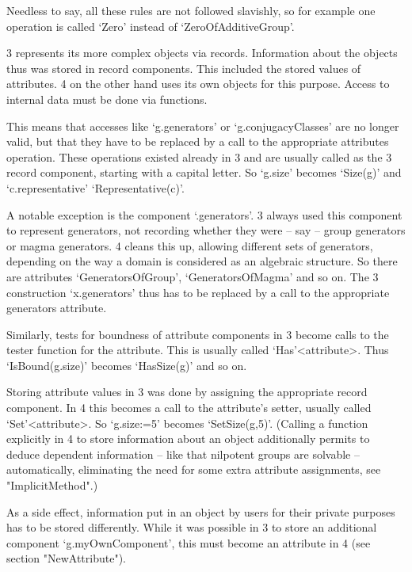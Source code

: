 Needless to say, all these rules are not followed slavishly, so for example
one operation is called `Zero' instead of `ZeroOfAdditiveGroup'.


{\GAP}3 represents its more complex objects via records. Information about the
objects thus was stored in record components. This included the stored
values of attributes. {\GAP}4 on the other hand uses its own objects for
this purpose. Access to internal data must be done via functions.

This means that accesses like `g.generators' or `g.conjugacyClasses' are no
longer valid, but that they have to be replaced by a call to the
appropriate attributes operation. These operations existed already in
{\GAP}3 and are usually called as the {\GAP}3 record component,
starting with a capital letter. 
So `g.size' becomes `Size(g)' and `c.representative' `Representative(c)'.

A notable exception is the component `.generators'. {\GAP}3 always used this
component to represent generators, not recording whether they were -- say --
group generators or magma generators. {\GAP}4 cleans this up, allowing
different sets of generators, depending on the way a domain is considered as
an algebraic structure. So there are attributes `GeneratorsOfGroup',
`GeneratorsOfMagma' and so on. The {\GAP}3 construction `x.generators' thus
has to be replaced by a call to the appropriate generators attribute.

Similarly, tests for boundness of attribute components in {\GAP}3 become
calls to the tester function for the attribute. This is usually called
`Has'<attribute>. Thus `IsBound(g.size)' becomes `HasSize(g)' and so on.

Storing attribute values in {\GAP}3 was done by assigning the appropriate
record component. In {\GAP}4 this becomes a call to the attribute's setter,
usually called `Set'<attribute>. So `g.size:=5' becomes `SetSize(g,5)'.
(Calling a function explicitly in {\GAP}4 to store information about an 
object additionally permits {\GAP} to deduce dependent information -- like
that nilpotent groups are solvable -- automatically, eliminating the need
for some extra attribute assignments, see "ImplicitMethod".)

As a side effect, information put in an object by users for their
private purposes has to be stored differently. While it was possible in
{\GAP}3 to store an additional component `g.myOwnComponent', this must
become an attribute in {\GAP}4 (see section "NewAttribute").

